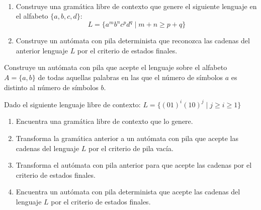 \begin{ejercicio}\label{ej:1.5.26}\ 
    \begin{enumerate}[label=\alph*)]
        \item Construye una gramática libre de contexto que genere el siguiente lenguaje en el alfabeto $\{a,b,c,d\}$:
            \begin{equation*}
                L = \{a^m b^n c^p d^q \mid m+n\geq p+q\}
            \end{equation*}
        \item Construye un autómata con pila determinista que reconozca las cadenas del anterior lenguaje $L$ por el criterio de estados finales.
    \end{enumerate}
\end{ejercicio}

\begin{ejercicio}\label{ej:1.5.27}
    Construye un autómata con pila que acepte el lenguaje sobre el alfabeto $A = \{a,b\}$ de todas aquellas palabras en las que el número de símbolos $a$ es distinto al número de símbolos $b$.
\end{ejercicio}

\begin{ejercicio}\label{ej:1.5.28}
    Dado el siguiente lenguaje libre de contexto: $L = \{{(01)}^{i}{(10)}^{j}\mid j\geq i \geq 1\}$
    \begin{enumerate}[label=(\alph*)]
        \item Encuentra una gramática libre de contexto que lo genere.
        \item Transforma la gramática anterior a un autómata con pila que acepte las cadenas del lenguaje $L$ por el criterio de pila vacía.
        \item Transforma el autómata con pila anterior para que acepte las cadenas por el criterio de estados finales.
        \item Encuentra un autómata con pila determinista que acepte las cadenas del lenguaje $L$ por el criterio de estados finales.
    \end{enumerate}
\end{ejercicio}

